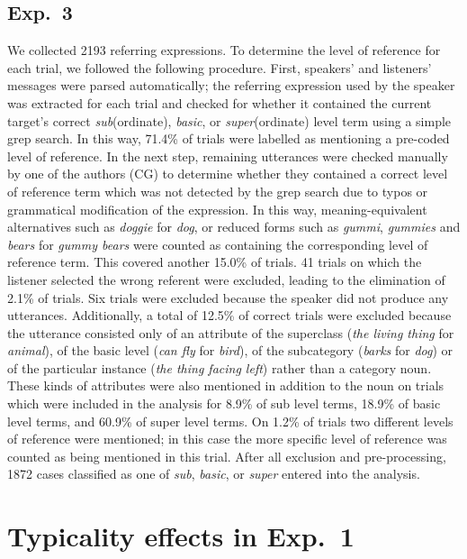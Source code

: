 \documentclass[11pt]{article}
\begin{document}
\subsection{Exp.~3}

We collected 2193 referring expressions. To determine the level of reference for each trial, we followed the following procedure. First, speakers' and listeners' messages were parsed automatically; the referring expression used by the speaker was extracted for each trial and checked for whether it contained the current target's correct \emph{sub}(ordinate), \emph{basic}, or \emph{super}(ordinate) level term using a simple grep search. In this way, 71.4\% of trials were labelled as mentioning a pre-coded level of reference. In the next step, remaining utterances were checked manually by one of the authors (CG) to determine whether they contained a correct level of reference term which was not detected by the grep search due to typos or grammatical modification of the expression. In this way, meaning-equivalent alternatives such as \emph{doggie} for \emph{dog}, or reduced forms such as \emph{gummi}, \emph{gummies} and \emph{bears} for \emph{gummy bears} were counted as containing the corresponding level of reference term. This covered another 15.0\% of trials. 41 trials on which the listener selected the wrong referent were excluded, leading to the elimination of 2.1\% of trials. Six trials were excluded because the speaker did not produce any utterances. Additionally, a total of 12.5\% of correct trials were excluded because the utterance consisted only of an attribute of the superclass (\emph{the living thing} for \emph{animal}), of the basic level (\emph{can fly} for \emph{bird}), of the subcategory (\emph{barks} for \emph{dog}) or of the particular instance (\emph{the thing facing left}) rather than a category noun. These kinds of attributes were also mentioned in addition to the noun on trials which were included in the analysis for 8.9\% of sub level terms, 18.9\% of basic level terms, and 60.9\% of super level terms. On 1.2\% of trials two different levels of reference were mentioned; in this case the more specific level of reference was counted as being mentioned in this trial. After all exclusion and pre-processing, 1872 cases classified as one of \emph{sub}, \emph{basic}, or \emph{super} entered into the analysis.


\section{Typicality effects in Exp.~1}
\label{sec:exp1typicality}
\end{document}
